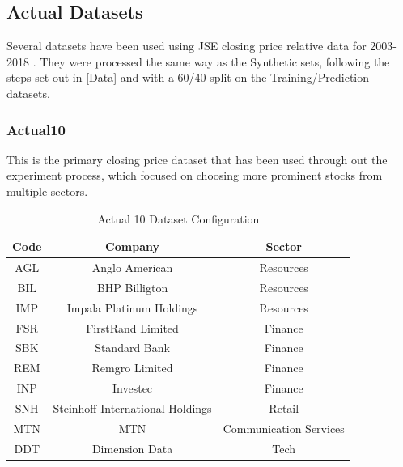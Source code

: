 \documentclass[a4paper,11pt,oneside]{article}
\theoremstyle{plain}
\theoremstyle{definition}
\begin{document}
	\subsection{Actual Datasets}
	
	Several datasets have been used using JSE closing price relative data for 2003-2018 . They were processed the same way as the Synthetic sets, following the steps set out in \ref{Data} and with a 60/40 split on the Training/Prediction datasets.
	
	\subsubsection{Actual10}\label{dataset_actual10}
	
	This is the primary closing price dataset that has been used through out the experiment process, which focused on choosing more prominent stocks from multiple sectors.
	
	\begin{table}[H]
		\centering
		\begin{tabular}{|c|c|c|}
			\hline
			\textbf{Code} &\textbf{Company} & \textbf{Sector} \\\hline	
			{AGL} & {Anglo American} & {Resources}  \\\hline
			{BIL} & {BHP Billigton} & {Resources}  \\\hline
			{IMP} & {Impala Platinum Holdings} & {Resources}  \\\hline
			{FSR} & {FirstRand Limited} & {Finance}  \\\hline
			{SBK} & {Standard Bank} & {Finance}  \\\hline
			{REM} & {Remgro Limited} & {Finance}  \\\hline
			{INP} & {Investec} & {Finance}  \\\hline
			{SNH} & {Steinhoff International Holdings} & {Retail}    \\\hline
			{MTN} & {MTN} & {Communication Services}  \\\hline
			{DDT} & {Dimension Data} & {Tech} \\\hline
		\end{tabular}
		\newline\newline
		\caption{Actual 10 Dataset Configuration}\label{tab_actual10}
	\end{table}
	
\end{document}
